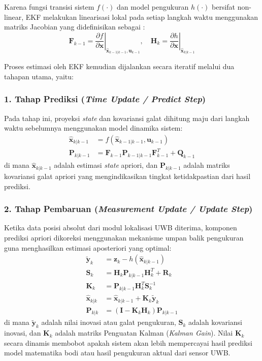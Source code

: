 \documentclass[12pt,a4paper]{report}
\numberwithin{equation}{chapter}
\begin{document}
Karena fungsi transisi sistem $f(\cdot)$ dan model pengukuran $h(\cdot)$ bersifat non-linear, EKF melakukan linearisasi lokal pada setiap langkah waktu menggunakan matriks Jacobian yang didefinisikan sebagai \cite{gelbAppliedOptimalEstimation1974}:
\begin{equation}
    \mathbf{F}_{k-1} = \left. \frac{\partial f}{\partial \mathbf{x}} \right|_{\hat{\mathbf{x}}_{k-1|k-1}, \mathbf{u}_{k-1}}, \quad \mathbf{H}_k = \left. \frac{\partial h}{\partial \mathbf{x}} \right|_{\hat{\mathbf{x}}_{k|k-1}}
\end{equation}

Proses estimasi oleh EKF kemudian dijalankan secara iteratif melalui dua tahapan utama, yaitu:

\subsubsection{1. Tahap Prediksi (\textit{Time Update / Predict Step})}
Pada tahap ini, proyeksi \textit{state} dan kovariansi galat dihitung maju dari langkah waktu sebelumnya menggunakan model dinamika sistem:
\begin{align}
    \hat{\mathbf{x}}_{k|k-1} &= f(\hat{\mathbf{x}}_{k-1|k-1}, \mathbf{u}_{k-1}) \\
    \mathbf{P}_{k|k-1} &= \mathbf{F}_{k-1} \mathbf{P}_{k-1|k-1} \mathbf{F}_{k-1}^T + \mathbf{Q}_{k-1}
\end{align}
di mana $\hat{\mathbf{x}}_{k|k-1}$ adalah estimasi \textit{state} apriori, dan $\mathbf{P}_{k|k-1}$ adalah matriks kovariansi galat apriori yang mengindikasikan tingkat ketidakpastian dari hasil prediksi.

\subsubsection{2. Tahap Pembaruan (\textit{Measurement Update / Update Step})}
Ketika data posisi absolut dari modul lokalisasi UWB diterima, komponen prediksi apriori dikoreksi menggunakan mekanisme umpan balik pengukuran guna menghasilkan estimasi aposteriori yang optimal:
\begin{align}
    \tilde{\mathbf{y}}_k &= \mathbf{z}_k - h(\hat{\mathbf{x}}_{k|k-1}) \\
    \mathbf{S}_k &= \mathbf{H}_k \mathbf{P}_{k|k-1} \mathbf{H}_k^T + \mathbf{R}_k \\
    \mathbf{K}_k &= \mathbf{P}_{k|k-1} \mathbf{H}_k^T \mathbf{S}_k^{-1} \\
    \hat{\mathbf{x}}_{k|k} &= \hat{\mathbf{x}}_{k|k-1} + \mathbf{K}_k \tilde{\mathbf{y}}_k \\
    \mathbf{P}_{k|k} &= (\mathbf{I} - \mathbf{K}_k \mathbf{H}_k) \mathbf{P}_{k|k-1}
\end{align}
di mana $\tilde{\mathbf{y}}_k$ adalah nilai inovasi atau galat pengukuran, $\mathbf{S}_k$ adalah kovariansi inovasi, dan $\mathbf{K}_k$ adalah matriks Penguatan Kalman (\textit{Kalman Gain}). Nilai $\mathbf{K}_k$ secara dinamis membobot apakah sistem akan lebih mempercayai hasil prediksi model matematika bodi atau hasil pengukuran aktual dari sensor UWB.
\end{document}
